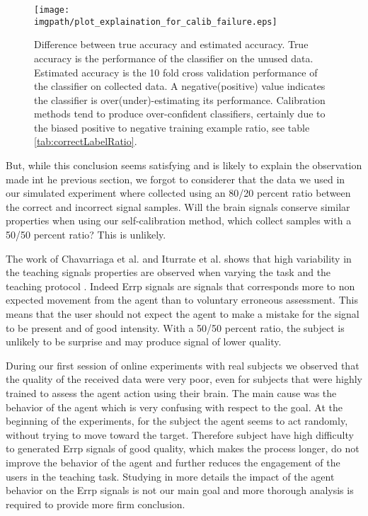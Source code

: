 \begin{figure}[!ht]
\centering
\texttt{[image: \\imgpath/plot\_explaination\_for\_calib\_failure.eps]}
\caption{Difference between true accuracy and estimated accuracy. True accuracy is the performance of the classifier on the unused data. Estimated accuracy is the 10 fold cross validation performance of the classifier on collected data. A negative(positive) value indicates the classifier is over(under)-estimating its performance. Calibration methods tend to produce over-confident classifiers, certainly due to the biased positive to negative training example ratio, see table \ref{tab:correctLabelRatio}.}
\label{fig:calibFail}
\end{figure}

But, while this conclusion seems satisfying and is likely to explain the observation made int he previous section, we forgot to considerer that the data we used in our simulated experiment where collected using an 80/20 percent ratio between the correct and incorrect signal samples. Will the brain signals conserve similar properties when using our self-calibration method, which collect samples with a 50/50 percent ratio? This is unlikely. 

The work of Chavarriaga et al. and Iturrate et al. shows that high variability in the teaching signals properties are observed when varying the task and the teaching protocol \cite{chavarriaga2010learning, iturrate2013task}. Indeed Errp signals are signals that corresponds more to non expected movement from the agent than to voluntary erroneous assessment. This means that the user should not expect the agent to make a mistake for the signal to be present and of good intensity. With a 50/50 percent ratio, the subject is unlikely to be surprise and may produce signal of lower quality.

During our first session of online experiments with real subjects we observed that the quality of the received data were very poor, even for subjects that were highly trained to assess the agent action using their brain. The main cause was the behavior of the agent which is very confusing with respect to the goal. At the beginning of the experiments, for the subject the agent seems to act randomly, without trying to move toward the target. Therefore subject have high difficulty to generated Errp signals of good quality, which makes the process longer, do not improve the behavior of the agent and further reduces the engagement of the users in the teaching task. Studying in more details the impact of the agent behavior on the Errp signals is not our main goal and more thorough analysis is required to provide more firm conclusion.

